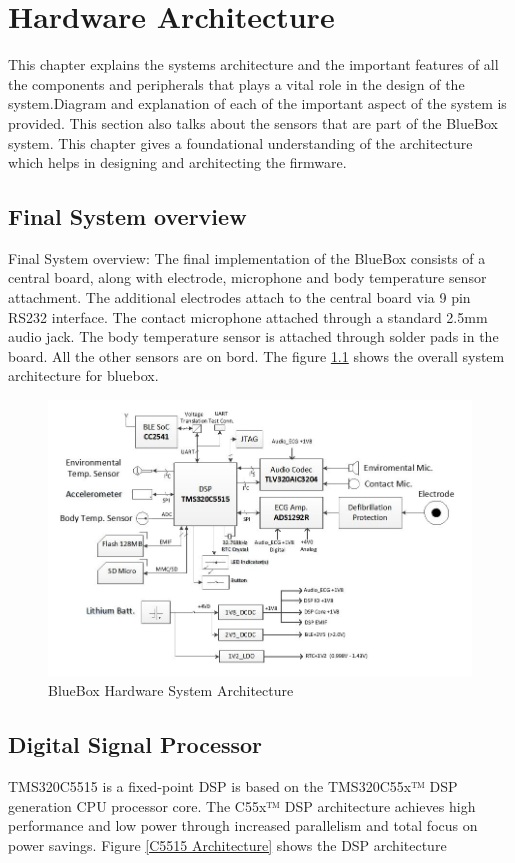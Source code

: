 \chapter{Hardware Architecture}
\hspace{10mm}This chapter explains the systems architecture and the important features of all the components and peripherals that plays a vital role in the design of the system.Diagram and explanation of each of the  important aspect of the system is provided. This section also talks about the sensors that are part of the BlueBox system. This chapter gives a foundational understanding of the architecture which helps in designing and architecting the firmware.

\section{Final System overview}
\hspace{10mm}Final System overview: 
The final implementation of the BlueBox consists of a central board, along with electrode, microphone and body temperature sensor attachment. The additional electrodes attach to the central board via 9 pin RS232 interface. The contact microphone attached through a standard 2.5mm audio jack. The body temperature sensor is attached through solder pads in the board. All the other sensors are on bord. 
The figure \ref{BlueBox_Architecture} shows the overall system architecture for bluebox.
\begin{figure}[h]
	\centering
	\includegraphics[scale = 0.75 ]{BlueBox_Architecture.JPG}
	\caption{BlueBox Hardware System Architecture\label{BlueBox_Architecture}}
\end{figure} 
\section{Digital Signal Processor}
TMS320C5515 is a fixed-point DSP is based on the TMS320C55x™ DSP generation CPU processor core. The C55x™ DSP architecture achieves high performance and low power through increased parallelism and total focus on power savings. Figure \ref{C5515 Architecture} shows the DSP architecture

